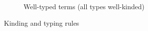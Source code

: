 \begin{figure}
\begin{subfigure}{\linewidth}
  \caption{Well-typed terms (all types well-kinded)}
\end{subfigure}
\caption{Kinding and typing rules}
\label{fig:typing}
\end{figure}
